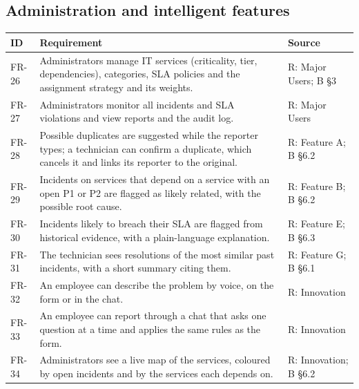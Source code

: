 \subsection*{Administration and intelligent features}
\begin{longtable}{@{}l>{\raggedright\arraybackslash}p{9.6cm}l@{}}
\toprule
\textbf{ID} & \textbf{Requirement} & \textbf{Source} \\
\midrule
\endhead
FR-26 & Administrators manage IT services (criticality, tier, dependencies), categories, SLA
  policies and the assignment strategy and its weights. & R: Major Users; B §3 \\
FR-27 & Administrators monitor all incidents and SLA violations and view reports and the audit
  log. & R: Major Users \\
FR-28 & Possible duplicates are suggested while the reporter types; a technician can confirm a
  duplicate, which cancels it and links its reporter to the original. & R: Feature A; B §6.2 \\
FR-29 & Incidents on services that depend on a service with an open P1 or P2 are flagged as
  likely related, with the possible root cause. & R: Feature B; B §6.2 \\
FR-30 & Incidents likely to breach their SLA are flagged from historical evidence, with a
  plain-language explanation. & R: Feature E; B §6.3 \\
FR-31 & The technician sees resolutions of the most similar past incidents, with a short
  summary citing them. & R: Feature G; B §6.1 \\
FR-32 & An employee can describe the problem by voice, on the form or in the chat. &
  R: Innovation \\
FR-33 & An employee can report through a chat that asks one question at a time and applies
  the same rules as the form. & R: Innovation \\
FR-34 & Administrators see a live map of the services, coloured by open incidents and by the
  services each depends on. & R: Innovation; B §6.2 \\
\bottomrule
\end{longtable}

